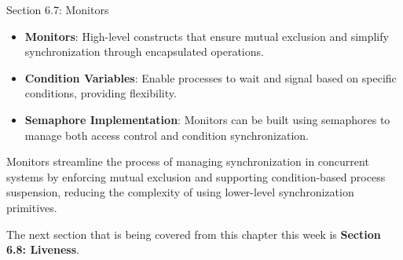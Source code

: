 \begin{notes}{Section 6.7: Monitors}
\begin{highlight}
    \end{highlight}
    
    \begin{highlight}
    
        \begin{itemize}
            \item \textbf{Monitors}: High-level constructs that ensure mutual exclusion and simplify synchronization through encapsulated operations.
            \item \textbf{Condition Variables}: Enable processes to wait and signal based on specific conditions, providing flexibility.
            \item \textbf{Semaphore Implementation}: Monitors can be built using semaphores to manage both access control and condition synchronization.
        \end{itemize}
    
    Monitors streamline the process of managing synchronization in concurrent systems by enforcing mutual exclusion and supporting condition-based process suspension, reducing the complexity of using 
    lower-level synchronization primitives.
    
    \end{highlight}
\end{notes}

The next section that is being covered from this chapter this week is \textbf{Section 6.8: Liveness}.

